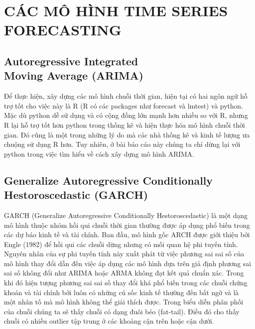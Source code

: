 
\newpage
\chapter{CÁC MÔ HÌNH TIME SERIES FORECASTING}
\centerline{\textbf{}}


 
\section{Autoregressive Integrated \\ Moving Average (ARIMA)}

\changefontsizes{13pt}
Để thực hiện, xây dựng các mô hình chuỗi thời gian, hiện tại có hai ngôn ngữ hỗ trợ tốt cho việc này là R (R có các packages như forecast và lmtest) và python. Mặc dù python dễ sử dụng và có cộng đồng lớn mạnh hơn nhiều so với R, nhưng R lại hỗ trợ tốt hơn python trong thống kê và hiện thực hóa mô hình chuỗi thời gian. Đó cũng là một trong những lý do mà các nhà thống kê và kinh tế lượng ưa chuộng sử dụng R hơn. Tuy nhiên, ở bài báo cáo này chúng ta chỉ dừng lại với python trong việc tìm hiểu về cách xây dựng mô hình ARIMA.




\section{Generalize Autoregressive Conditionally \\ Hestoroscedastic (GARCH)}

\vspace{1cm}
\changefontsizes{13pt}
GARCH (Generalize Autoregressive Conditionally Hestoroscedastic) là một dạng mô hình thuộc nhóm hồi qui chuỗi thời gian thường được áp dụng phổ biến trong các dự báo kinh tế và tài chính. Ban đầu, mô hình gốc ARCH được giới thiệu bởi Engle (1982) để hồi qui các chuỗi dừng nhưng có mối quan hệ phi tuyến tính. Nguyên nhân của sự phi tuyến tính này xuất phát từ việc phương sai sai số của mô hình thay đổi dẫn đến việc áp dụng các mô hình dựa trên giả định phương sai sai số không đổi như ARIMA hoặc ARMA không đạt kết quả chuẩn xác. Trong khi đó hiện tượng phương sai sai số thay đổi khá phổ biến trong các chuỗi chứng khoán và tài chính bởi luôn có những cú sốc kinh tế thường đến bất ngờ và là một nhân tố mà mô hình không thể giải thích được. Trong biểu diễn phân phối của chuỗi chúng ta sẽ thấy chuỗi có dạng đuôi béo (fat-tail). Điều đó cho thấy chuỗi có nhiều outlier tập trung ở các khoảng cận trên hoặc cận dưới.

